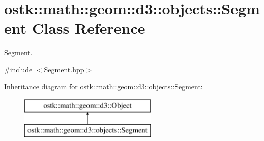 \hypertarget{classostk_1_1math_1_1geom_1_1d3_1_1objects_1_1_segment}{}\section{ostk\+:\+:math\+:\+:geom\+:\+:d3\+:\+:objects\+:\+:Segment Class Reference}
\label{classostk_1_1math_1_1geom_1_1d3_1_1objects_1_1_segment}


\hyperlink{classostk_1_1math_1_1geom_1_1d3_1_1objects_1_1_segment}{Segment}.  




{\ttfamily \#include $<$Segment.\+hpp$>$}

Inheritance diagram for ostk\+:\+:math\+:\+:geom\+:\+:d3\+:\+:objects\+:\+:Segment\+:\begin{figure}[H]
\begin{center}
\leavevmode
\includegraphics[height=2.000000cm]{classostk_1_1math_1_1geom_1_1d3_1_1objects_1_1_segment}
\end{center}
\end{figure}
